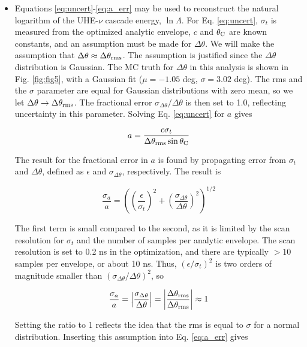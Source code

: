 \documentclass[amsmath,amssymb,aps,prd,10pt,twocolumn,showkeys]{revtex4}
\begin{document}
\begin{itemize}
\item Equations \ref{eq:uncert}-\ref{eq:a_err} may be used to reconstruct the natural logarithm of the UHE-$\nu$ cascade energy, $\ln\Lambda$.  For Eq. \ref{eq:uncert}, $\sigma_t$ is measured from the optimized analytic envelope, $c$ and $\theta_{\rm C}$ are known constants, and an assumption must be made for $\Delta\theta$.  We will make the assumption that $\Delta\theta \approx \Delta\theta_{\rm rms}$.  The assumption is justified since the $\Delta\theta$ distribution is Gaussian.  The MC truth for $\Delta\theta$ in this analysis is shown in Fig. \ref{fig:fig5}, with a Gaussian fit ($\mu=-1.05$ deg, $\sigma=3.02$ deg).  The rms and the $\sigma$ parameter are equal for Gaussian distributions with zero mean, so we let $\Delta\theta \to \Delta \theta_{\rm rms}$.  The fractional error $\sigma_{\Delta\theta}/\Delta\theta$ is then set to 1.0, reflecting uncertainty in this parameter.  Solving Eq. \ref{eq:uncert} for $a$ gives

\begin{equation}
a = \frac{c\sigma_t}{\Delta\theta_{\rm rms} \sin\theta_{\rm C}}
\end{equation}

The result for the fractional error in $a$ is found by propagating error from $\sigma_t$ and $\Delta\theta$, defined as $\epsilon$ and $\sigma_{\Delta\theta}$, respectively.  The result is

\begin{equation}
\frac{\sigma_a}{a} = \left(\left(\frac{\epsilon}{\sigma_t}\right)^2 +  \left(\frac{\sigma_{\Delta\theta}}{\Delta\theta}\right)^2\right)^{1/2}
\end{equation}

The first term is small compared to the second, as it is limited by the scan resolution for $\sigma_t$ and the number of samples per analytic envelope.  The scan resolution is set to 0.2 ns in the optimization, and there are typically $>10$ samples per envelope, or about 10 ns.  Thus, $\left(\epsilon/\sigma_t\right)^2$ is two orders of magnitude smaller than $\left(\sigma_{\Delta\theta}/\Delta\theta\right)^2$, so

\begin{equation}
\frac{\sigma_a}{a} = \left|\frac{\sigma_{\Delta\theta}}{\Delta\theta}\right| = \left|\frac{\Delta\theta_{\rm rms}}{\Delta\theta_{\rm rms}}\right|\approx 1
\end{equation}

Setting the ratio to 1 reflects the idea that the rms is equal to $\sigma$ for a normal distribution.  Inserting this assumption into Eq. \ref{eq:a_err} gives


\end{itemize}
\end{document}
